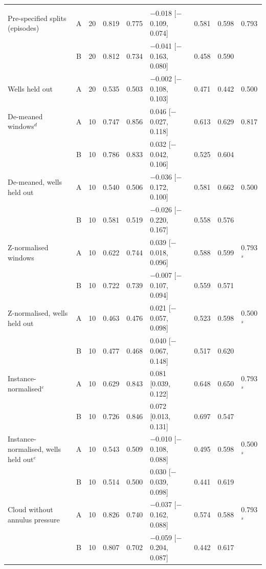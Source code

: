 \begin{tabular}{@{}>{\raggedright\arraybackslash}p{2.9cm} c r lll ll l@{}}
\multicolumn{9}{@{}l}{\textit{3W}} \\
Pre-specified splits (episodes) & A & 20 & 0.819 & 0.775 & $-$0.018 [$-$0.109, 0.074] & 0.581 & 0.598 & 0.793 \\
 & B & 20 & 0.812 & 0.734 & $-$0.041 [$-$0.163, 0.080] & 0.458 & 0.590 &  \\
Wells held out & A & 20 & 0.535 & 0.503 & $-$0.002 [$-$0.108, 0.103] & 0.471 & 0.442 & 0.500 \\
De-meaned windows$^{d}$ & A & 10 & 0.747 & 0.856 & 0.046 [$-$0.027, 0.118] & 0.613 & 0.629 & 0.817 \\
 & B & 10 & 0.786 & 0.833 & 0.032 [$-$0.042, 0.106] & 0.525 & 0.604 &  \\
De-meaned, wells held out & A & 10 & 0.540 & 0.506 & $-$0.036 [$-$0.172, 0.100] & 0.581 & 0.662 & 0.500 \\
 & B & 10 & 0.581 & 0.519 & $-$0.026 [$-$0.220, 0.167] & 0.558 & 0.576 &  \\
Z-normalised windows & A & 10 & 0.622 & 0.744 & 0.039 [$-$0.018, 0.096] & 0.588 & 0.599 & 0.793$^{s}$ \\
 & B & 10 & 0.722 & 0.739 & $-$0.007 [$-$0.107, 0.094] & 0.559 & 0.571 &  \\
Z-normalised, wells held out & A & 10 & 0.463 & 0.476 & 0.021 [$-$0.057, 0.098] & 0.523 & 0.598 & 0.500$^{s}$ \\
 & B & 10 & 0.477 & 0.468 & 0.040 [$-$0.067, 0.148] & 0.517 & 0.620 &  \\
Instance-normalised$^{e}$ & A & 10 & 0.629 & 0.843 & 0.081 [0.039, 0.122] & 0.648 & 0.650 & 0.793$^{s}$ \\
 & B & 10 & 0.726 & 0.846 & 0.072 [0.013, 0.131] & 0.697 & 0.547 &  \\
Instance-normalised, wells held out$^{e}$ & A & 10 & 0.543 & 0.509 & $-$0.010 [$-$0.108, 0.088] & 0.495 & 0.598 & 0.500$^{s}$ \\
 & B & 10 & 0.514 & 0.500 & 0.030 [$-$0.039, 0.098] & 0.441 & 0.619 &  \\
Cloud without annulus pressure & A & 10 & 0.826 & 0.740 & $-$0.037 [$-$0.162, 0.088] & 0.574 & 0.588 & 0.793$^{s}$ \\
 & B & 10 & 0.807 & 0.702 & $-$0.059 [$-$0.204, 0.087] & 0.442 & 0.617 &  \\
\bottomrule
\end{tabular}
